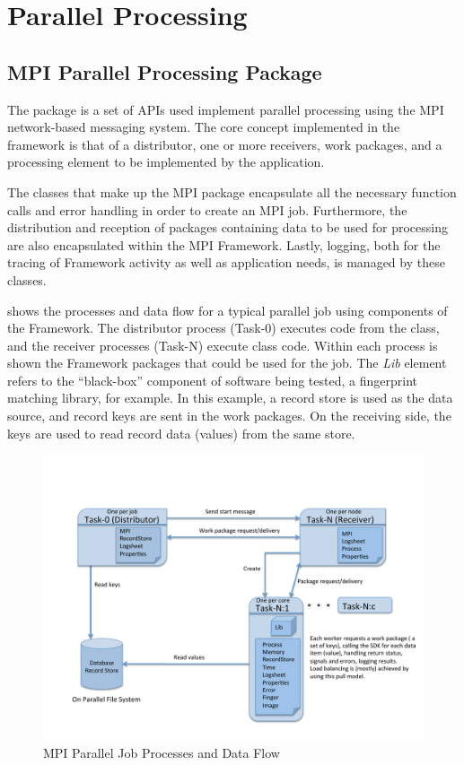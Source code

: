 %
%
\chapter{Parallel Processing}
\label{chp-parallel}

\section{MPI Parallel Processing Package}
The  package is a set of APIs used implement parallel processing
using the MPI~\cite{mpi} network-based messaging system. The core concept
implemented in the framework is that of a distributor, one or more receivers,
work packages, and a processing element to be implemented by the application.

The classes that make up the MPI package encapsulate all the necessary function
calls and error handling in order to create an MPI job. Furthermore, the
distribution and reception of packages containing data to be used for processing
are also encapsulated within the MPI Framework. Lastly, logging, both for the
tracing of Framework activity as well as application needs, is managed by
these classes.

 shows the processes and data flow for a typical 
parallel job using components of the Framework. The distributor process
(Task-0)
executes code from the  class, and the receiver processes
(Task-N)
execute  class code. Within each process is shown
the Framework packages that could be used for the job. The {\em Lib} element
refers to the ``black-box'' component of software being tested, a fingerprint
matching library, for example. In this example, a record store is used as the
data source, and record keys are sent in the work packages. On the receiving
side, the keys are used to read record data (values) from the same store.

\begin{figure}
	\centering
	\includegraphics[width=\textwidth]{ParallelJob}
	\caption{MPI Parallel Job Processes and Data Flow}
	\label{fig:paralleljob}
\end{figure}

